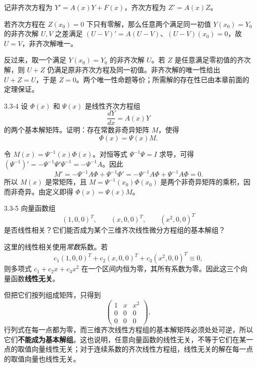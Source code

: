 \documentclass[UTF8,a4paper,11pt]{ctexart}
\begin{document}
\begin{solution}
记非齐次方程为 $Y'=A(x)Y+F(x)$，齐次方程为 $Z'=A(x)Z$。

若齐次方程在 $Z(x_0)=0$ 下只有零解，那么任意两个满足同一初值 $Y(x_0)=Y_0$ 的非齐次解 $U,V$ 之差满足
$(U-V)'=A(U-V)$、$(U-V)(x_0)=0$，故 $U=V$，非齐次解唯一。

反过来，取一个满足 $Y(x_0)=Y_0$ 的非齐次解 $U$。若 $Z$ 是任意满足零初值的齐次解，则 $U+Z$ 仍满足原非齐次方程及同一初值。非齐次解的唯一性给出 $U+Z=U$，于是 $Z=0$。两个唯一性命题等价；所需解的存在性已由本章前面的定理保证。
\end{solution}

\begin{problem}{3.3-4}
设 $\Phi(x)$ 和 $\Psi(x)$ 是线性齐次方程组
  \[
    \frac{dY}{dx}=A(x)Y
  \]
  的两个基本解矩阵。证明：存在常数非奇异矩阵 $M$，使得
  \[
    \Phi(x)=\Psi(x)M.
  \]
\end{problem}

\begin{solution}
令 $M(x)=\Psi^{-1}(x)\Phi(x)$。对恒等式 $\Psi^{-1}\Psi=I$ 求导，可得
$(\Psi^{-1})'=-\Psi^{-1}\Psi'\Psi^{-1}=-\Psi^{-1}A$。因此
\[
M'=-\Psi^{-1}A\Phi+\Psi^{-1}\Phi'
=-\Psi^{-1}A\Phi+\Psi^{-1}A\Phi=0.
\]
所以 $M(x)$ 是常矩阵，且 $M=\Psi^{-1}(x_0)\Phi(x_0)$ 是两个非奇异矩阵的乘积，因而非奇异。由定义即得 $\boxed{\Phi(x)=\Psi(x)M}$。
\end{solution}

\begin{problem}{3.3-5}
向量函数组
  \[
    (1,0,0)^{T},\qquad (x,0,0)^{T},\qquad (x^2,0,0)^{T}
  \]
  是否线性相关？它们能否成为某个三维齐次线性微分方程组的基本解组？
\end{problem}

\begin{solution}
这里的线性相关使用\emph{常数}系数。若
\[
c_1(1,0,0)^T+c_2(x,0,0)^T+c_3(x^2,0,0)^T\equiv0,
\]
则多项式 $c_1+c_2x+c_3x^2$ 在一个区间内恒为零，其所有系数为零。因此这三个向量函数\textbf{线性无关}。

但把它们按列组成矩阵，只得到
\[
\begin{pmatrix}1&x&x^2\\0&0&0\\0&0&0\end{pmatrix},
\]
行列式在每一点都为零，而三维齐次线性方程组的基本解矩阵必须处处可逆，所以它们\textbf{不能成为基本解组}。这也说明，任意向量函数的线性无关，不等于它们在某一点的取值向量线性无关；对于连续系数的齐次线性方程组，线性无关的解在每一点的取值向量也线性无关。
\end{solution}
\end{document}
